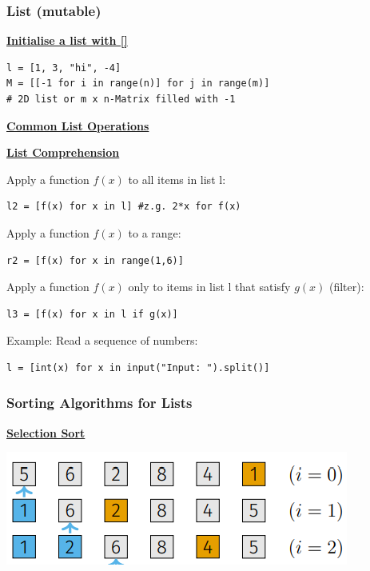 \subsubsection{List (mutable)}
{\centering\underline{\textbf{Initialise a list with []}} \par}
\begin{lstlisting}
l = [1, 3, "hi", -4]
M = [[-1 for i in range(n)] for j in range(m)]
# 2D list or m x n-Matrix filled with -1
\end{lstlisting}

{\centering\underline{\textbf{Common List Operations}} \par}


{\centering\underline{\textbf{List Comprehension}} \par}
Apply a function $f(x)$ to all items in list l:
\begin{lstlisting}
l2 = [f(x) for x in l] #z.g. 2*x for f(x)
\end{lstlisting}
Apply a function $f(x)$ to a range:
\begin{lstlisting}
r2 = [f(x) for x in range(1,6)]
\end{lstlisting}
Apply a function $f(x)$ only to items in list l that satisfy $g(x)$ (filter):
\begin{lstlisting}
l3 = [f(x) for x in l if g(x)]
\end{lstlisting}
Example: Read a sequence of numbers:
\begin{lstlisting}
l = [int(x) for x in input("Input: ").split()]
\end{lstlisting}

\subsubsection{Sorting Algorithms for Lists} \label{section_sorting_list}
    {\centering\underline{\textbf{Selection Sort}} \par}
        \begin{minipage}{0.59\linewidth}
            \includegraphics[width = \linewidth]{src/3_containers/images/selection_sort.png}
        \end{minipage}
        \begin{minipage}{0.39\linewidth}
            \\
            \\
        \end{minipage}

